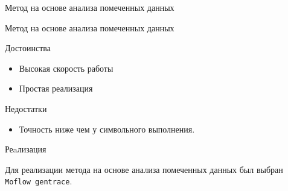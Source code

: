 \documentclass[10pt]{beamer}
\begin{document}
\begin{frame}[fragile]{Метод на основе анализа помеченных данных}


\end{frame}

\begin{frame}{Метод на основе анализа помеченных данных}

\begin{block}{Достоинства}
  \begin{itemize}
    \item Высокая скорость работы
    \item Простая реализация
  \end{itemize}
\end{block}
\pause
  \begin{block}{Недостатки}
    \begin{itemize}
      \item Точность ниже чем у символьного выполнения.
    \end{itemize}
  \end{block}
\end{frame}

\begin{frame}{Реaлизация}

Для реализации метода на основе анализа помеченных данных был выбран \texttt{Moflow gentrace}.

\end{frame}
\end{document}
